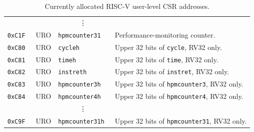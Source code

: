 \begin{table}[htb!]
\begin{center}
\begin{tabular}{|l|l|l|l|}
& & \multicolumn{1}{c|}{\vdots} & \ \\
\tt 0xC1F & URO  &\tt hpmcounter31  & Performance-monitoring counter. \\
\tt 0xC80 & URO  &\tt cycleh        & Upper 32 bits of {\tt cycle}, RV32 only. \\
\tt 0xC81 & URO  &\tt timeh         & Upper 32 bits of {\tt time}, RV32 only. \\
\tt 0xC82 & URO  &\tt instreth      & Upper 32 bits of {\tt instret}, RV32 only. \\
\tt 0xC83 & URO  &\tt hpmcounter3h  & Upper 32 bits of {\tt hpmcounter3}, RV32 only. \\
\tt 0xC84 & URO  &\tt hpmcounter4h  & Upper 32 bits of {\tt hpmcounter4}, RV32 only. \\
& & \multicolumn{1}{c|}{\vdots} & \ \\
\tt 0xC9F & URO  &\tt hpmcounter31h & Upper 32 bits of {\tt hpmcounter31}, RV32 only. \\
\hline
\end{tabular}
\end{center}
\caption{Currently allocated RISC-V user-level CSR addresses.}
\label{ucsrnames}
\end{table}

